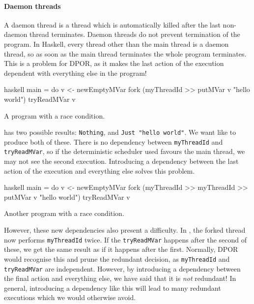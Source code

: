 \paragraph{Daemon threads}
A daemon thread is a thread which is automatically killed after the
last non-daemon thread terminates.  Daemon threads do not prevent
termination of the program.  In Haskell, every thread other than the
main thread is a daemon thread, so as soon as the main thread
terminates the whole program terminates.  This is a problem for DPOR,
as it makes the last action of the execution dependent with everything
else in the program!

\begin{listing}
\centering
\begin{cminted}{haskell}
main = do
  v <- newEmptyMVar
  fork (myThreadId >> putMVar v "hello world")
  tryReadMVar v
\end{cminted}
\caption{A program with a race condition.}\label{lst:daemon1}
\end{listing}

 has two possible results: \verb|Nothing|, and
\verb|Just "hello world"|.  We want like \dejafu{} to produce both of
these.  There is no dependency between \verb|myThreadId| and
\verb|tryReadMVar|, so if the deterministic scheduler used favours the
main thread, we may not see the second execution.  Introducing a
dependency between the last action of the execution and everything
else solves this problem.

\begin{listing}
\centering
\begin{cminted}{haskell}
main = do
  v <- newEmptyMVar
  fork (myThreadId >> myThreadId >> putMVar v "hello world")
  tryReadMVar v
\end{cminted}
\caption{Another program with a race condition.}\label{lst:daemon2}
\end{listing}

However, these new dependencies also present a difficulty.  In
, the forked thread now performs \verb|myThreadId|
twice.  If the \verb|tryReadMVar| happens after the second of these,
we get the same result as if it happens after the first.  Normally,
DPOR would recognise this and prune the redundant decision, as
\verb|myThreadId| and \verb|tryReadMVar| are independent.  However, by
introducing a dependency between the final action and everything else,
we have said that it is \emph{not} redundant!  In general, introducing
a dependency like this will lead to many redundant executions which we
would otherwise avoid.

